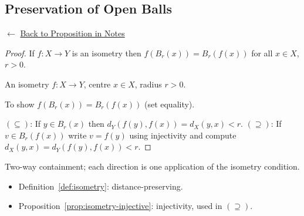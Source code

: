 
\subsection*{Preservation of Open Balls}
\label{prf:isometry-preserves-balls}

\begin{remark*}[Return]
$\leftarrow$ \hyperref[prop:isometry-preserves-balls]{Back to Proposition in Notes}
\end{remark*}

\begin{proof}
\Claim If $f : X \to Y$ is an isometry then
$f(B_r(x)) = B_r(f(x))$ for all $x \in X$, $r > 0$.

\Given An isometry $f : X \to Y$, centre $x \in X$, radius $r > 0$.

\Goal To show $f(B_r(x)) = B_r(f(x))$ (set equality).

\Strategy
$(\subseteq)$: If $y \in B_r(x)$ then $d_Y(f(y),f(x)) = d_X(y,x) < r$.
$(\supseteq)$: If $v \in B_r(f(x))$ write $v = f(y)$ using injectivity
and compute $d_X(y,x) = d_Y(f(y),f(x)) < r$.


\end{proof}

\begin{remark*}
Two-way containment; each direction is one application of the isometry
condition.
\end{remark*}

\begin{remark*}[Dependencies]
\begin{itemize}
  \item Definition~\ref{def:isometry}: distance-preserving.
  \item Proposition~\ref{prop:isometry-injective}: injectivity, used in $(\supseteq)$.
\end{itemize}
\end{remark*}
